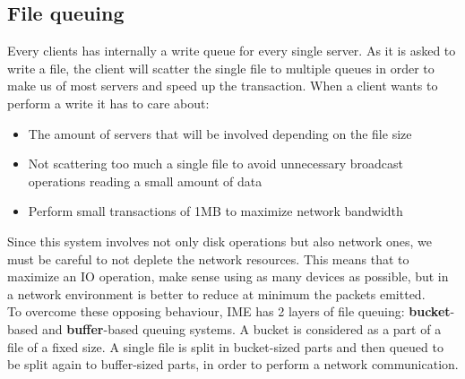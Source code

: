 \subsection{File queuing}
Every clients has internally a write queue for every single server. As it is
asked to write a file, the client will scatter the single file to multiple
queues in order to make us of most servers and speed up the transaction.
When a client wants to perform a write it has to care about:
\begin{itemize}
    \item The amount of servers that will be involved depending on the file size
    \item Not scattering too much a single file to avoid unnecessary broadcast
        operations reading a small amount of data
    \item Perform small transactions of 1MB to maximize network bandwidth
\end{itemize}
Since this system involves not only disk operations but also network ones, we
must be careful to not deplete the network resources. This means that to
maximize an IO operation, make sense using as many devices as possible, but in
a network environment is better to reduce at minimum the packets emitted. \\ To
overcome these opposing behaviour, IME has 2 layers of file queuing:
\textbf{bucket}-based and \textbf{buffer}-based queuing systems.  A bucket is
considered as a part of a file of a fixed size. A single file is split in
bucket-sized parts and then queued to be split again to buffer-sized parts, in
order to perform a network communication.


